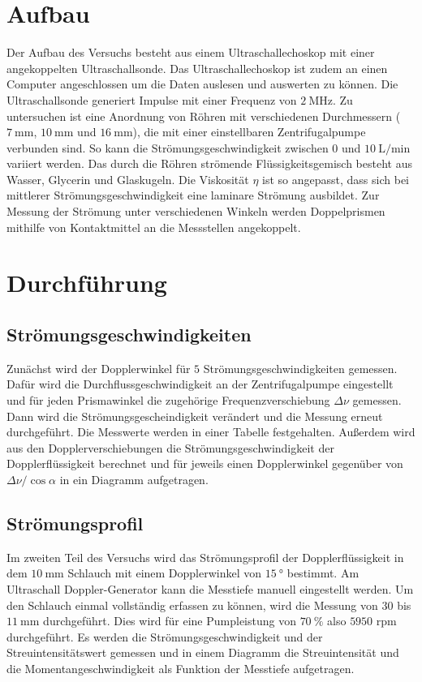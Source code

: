 \section{Aufbau}
\label{sec:Aufbau}
Der Aufbau des Versuchs besteht aus einem Ultraschallechoskop mit einer angekoppelten Ultraschallsonde. Das Ultraschallechoskop
ist zudem an einen Computer angeschlossen um die Daten auslesen und auswerten zu können.
Die Ultraschallsonde generiert Impulse mit einer Frequenz von $\qty{2}{\mega\hertz}$.
Zu untersuchen ist eine Anordnung von Röhren mit verschiedenen Durchmessern ($\qty{7}{\milli\meter}$, $\qty{10}{\milli\meter}$ und $\qty{16}{\milli\meter}$), die mit einer einstellbaren
Zentrifugalpumpe verbunden sind. So kann die Strömungsgeschwindigkeit zwischen $0$ und $\qty{10}{\liter\per\minute}$ variiert werden.
Das durch die Röhren strömende Flüssigkeitsgemisch besteht aus Wasser, Glycerin und Glaskugeln.
Die Viskosität $\eta$ ist so angepasst, dass sich bei mittlerer Strömungsgeschwindigkeit eine laminare Strömung ausbildet.
Zur Messung der Strömung unter verschiedenen Winkeln werden Doppelprismen mithilfe von Kontaktmittel an die Messstellen
angekoppelt.\\

\section{Durchführung}
\label{sec:Durchführung}
\subsection{Strömungsgeschwindigkeiten}
\label{sub:Strömungsgeschwindigkeiten_durch}
Zunächst wird der Dopplerwinkel für $5$ Strömungsgeschwindigkeiten gemessen.
Dafür wird die Durchflussgeschwindigkeit an der Zentrifugalpumpe eingestellt und für jeden Prismawinkel die
zugehörige Frequenzverschiebung $\Delta \nu$ gemessen. 
Dann wird die Strömungsgescheindigkeit verändert und die Messung erneut durchgeführt.
Die Messwerte werden in einer Tabelle festgehalten.
Außerdem wird aus den Dopplerverschiebungen die Strömungsgeschwindigkeit der Dopplerflüssigkeit berechnet und 
für jeweils einen Dopplerwinkel gegenüber von $\Delta \nu / \cos{\alpha}$ in ein Diagramm aufgetragen.\\

\subsection{Strömungsprofil}
\label{sub:Strömungsprofil_durch}
Im zweiten Teil des Versuchs wird das Strömungsprofil der Dopplerflüssigkeit in dem $\qty{10}{\milli\meter}$ Schlauch mit einem Dopplerwinkel
von $\qty{15}{\degree}$ bestimmt.
Am Ultraschall Doppler-Generator kann die Messtiefe manuell eingestellt werden. Um den Schlauch einmal vollständig
erfassen zu können, wird die Messung von $30$ bis $\qty{11}{\milli\meter}$ durchgeführt. Dies wird für eine
Pumpleistung von $\qty{70}{\percent}$ also $5950$ rpm durchgeführt.
Es werden die Strömungsgeschwindigkeit und der Streuintensitätswert gemessen und in einem Diagramm die
Streuintensität und die Momentangeschwindigkeit als Funktion der Messtiefe aufgetragen.


